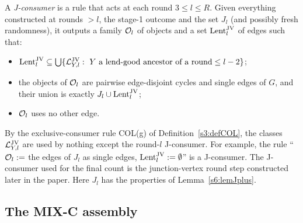 \begin{definition}\label{s6:defJconsumer}
A \emph{J-consumer} is a rule that acts at each round $3\le l\le R$. Given everything constructed at rounds $>l$, the stage-1 outcome and the set $J_l$ (and possibly fresh randomness), it outputs a family $\mathcal{O}_l$ of objects and a set $\mathrm{Lent}^{\mathrm{JV}}_l$ of edges such that:
\begin{itemize}
\item[\JC{1}] $\mathrm{Lent}^{\mathrm{JV}}_l\subseteq\bigcup\{\mathcal{L}^{\mathrm{JV}}_{Y,l}:\ Y\text{ a lend-good ancestor of a round}\le l-2\}$;
\item[\JC{2}] the objects of $\mathcal{O}_l$ are pairwise edge-disjoint cycles and single edges of $G$, and their union is exactly $J_l\cup\mathrm{Lent}^{\mathrm{JV}}_l$;
\item[\JC{3}] $\mathcal{O}_l$ uses no other edge.
\end{itemize}
By the exclusive-consumer rule COL(g) of Definition~\ref{s3:defCOL}, the classes $\mathcal{L}^{\mathrm{JV}}_{Y,l}$ are used by nothing except the round-$l$ J-consumer. For example, the rule ``$\mathcal{O}_l:=$ the edges of $J_l$ as single edges, $\mathrm{Lent}^{\mathrm{JV}}_l:=\emptyset$'' is a J-consumer. The J-consumer used for the final count is the junction-vertex round step constructed later in the paper. Here $J_l$ has the properties of Lemma~\ref{s6:lemJplus}.
\deps{\ref{s3:defCOL}, \ref{s6:lemJplus}}
\end{definition}

\subsection{The MIX-C assembly}

